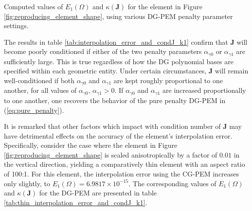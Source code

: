 \begin{table}
\caption{Computed values of $E_1 (\Omega)$ and $\kappa(\mathbf{J})$ for the element in Figure \ref{fig:reproducing_element_shape}, using various DG-PEM penalty parameter settings.}
\label{tab:interpolation_error_and_condJ_k1}
\end{table}

The results in table \ref{tab:interpolation_error_and_condJ_k1} confirm that $\mathbf{J}$ will become poorly conditioned if either of the two penalty parameters $\alpha_{\gamma0}$ or $\alpha_{\gamma1}$ are sufficiently large. This is true regardless of how the DG polynomial bases are specified within each geometric entity. Under certain circumstances, $\mathbf{J}$ will remain well-conditioned if both $\alpha_{\gamma0}$ and $\alpha_{\gamma1}$ are kept roughly proportional to one another, for all values of $\alpha_{\gamma0}, \, \alpha_{\gamma1} > 0$. If $\alpha_{\gamma0}$ and $\alpha_{\gamma1}$ are increased proportionally to one another, one recovers the behavior of the pure penalty DG-PEM in (\ref{eq:pure_penalty}).

It is remarked that other factors which impact with condition number of $\mathbf{J}$ may have detrimental effects on the accuracy of the element's interpolation error. Specifically, consider the case where the element in Figure \ref{fig:reproducing_element_shape} is scaled anisotropically by a factor of $0.01$ in the vertical direction, yielding a comparatively thin element with an aspect ratio of 100:1. For this element, the interpolation error using the CG-PEM increases only slightly, to $E_1 (\Omega) = 6.9817 \times 10^{-15}$. The corresponding values of $E_1 (\Omega)$ and $\kappa(\mathbf{J})$ for the DG-PEM are presented in table \ref{tab:thin_interpolation_error_and_condJ_k1}.

